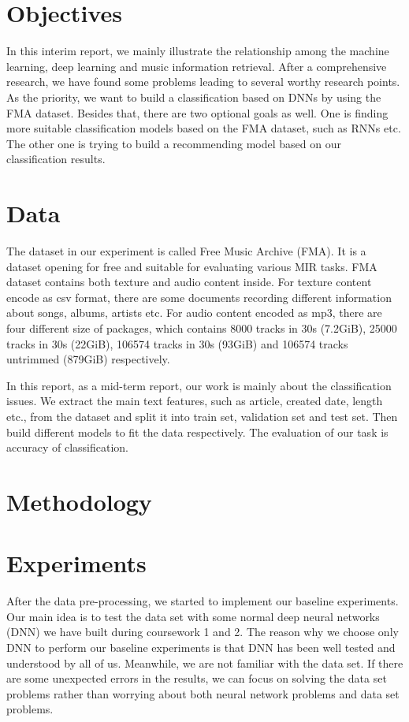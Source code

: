 \documentclass{article}
\begin{document}
\section{Objectives}
In this interim report, we mainly illustrate the relationship among the machine learning, deep learning and music information retrieval. After a comprehensive research, we have found some problems leading to several worthy research points. As the priority, we want to build a classification based on DNNs by using the FMA dataset. Besides that, there are two optional goals as well. One is finding more suitable classification models based on the FMA dataset, such as RNNs etc. The other one is trying to build a recommending model based on our classification results.




\section{Data}
The dataset in our experiment is called Free Music Archive (FMA). It is a dataset opening for free and suitable for evaluating various MIR tasks. FMA dataset contains both texture and audio content inside. For texture content encode as csv format, there are some documents recording different information about songs, albums, artists etc. For audio content encoded as mp3, there are four different size of packages, which contains 8000 tracks in 30s (7.2GiB), 25000 tracks in 30s (22GiB), 106574 tracks in 30s (93GiB) and 106574 tracks untrimmed (879GiB) respectively. 

In this report, as a mid-term report, our work is mainly about the classification issues. We extract the main text features, such as article, created date, length etc., from the dataset and split it into train set, validation set and test set. Then build different models to fit the data respectively. The evaluation of our task is accuracy of classification. 


\section{Methodology}

\newpage
\section{Experiments}
After the data pre-processing, we started to implement our baseline experiments. Our main idea is to test the data set with some normal deep neural networks (DNN) we have built during coursework 1 and 2. The reason why we choose only DNN to perform our baseline experiments is  that DNN has been well tested and understood by all of us. Meanwhile, we are not familiar with the data set. If there are some unexpected errors in the results, we can focus on solving the data set problems rather than worrying about both neural network problems and data set problems.
\end{document}
